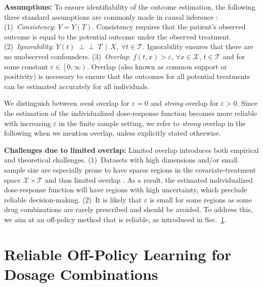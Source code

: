 \documentclass{article}
\theoremstyle{definition}
\theoremstyle{plain}
\newcommand{\indep}{\perp \!\!\! \perp}
\begin{document}
\textbf{Assumptions:} To ensure identifiability of the outcome estimation, the following three standard assumptions are commonly made in causal inference \cite{Rubin.1974}: (1)~\emph{Consistency}: $Y = Y(T)$. Consistency requires that the patient's observed outcome is equal to the potential outcome under the observed treatment. (2)~\emph{Ignorability}: $Y(t) \; \indep \; T\,\mid\,X, \; \forall t \in \mathcal{T}$. Ignorability ensures that there are no unobserved confounders. (3)~\emph{Overlap}: $f(t, x) > \varepsilon$,  $\forall x \in \mathcal{X},\, t \in \mathcal{T}$ and for some constant $\varepsilon \in \left[0, \infty \right)$. Overlap (also known as {common support} or {positivity}) is necessary to ensure that the outcomes for all potential treatments can be estimated accurately for all individuals. 

We distinguish between \emph{weak} overlap for $\varepsilon = 0$ and \emph{strong} overlap for $\varepsilon > 0$. Since the estimation of the individualized dose-response function becomes more reliable with increasing $\varepsilon$ in the finite sample setting, we refer to \emph{strong} overlap in the following when we mention overlap, unless explicitly stated otherwise. 

\textbf{Challenges due to limited overlap:} Limited overlap introduces both empirical and theoretical challenges. (1)~Datasets with high dimensions and/or small sample size are especially prone to have sparse regions in the covariate-treatment space $\mathcal{X} \times \mathcal{T}$ and thus limited overlap \cite{DAmour.2021}. As a result, the estimated individualized dose-response function will have regions with high uncertainty, which preclude reliable decision-making. (2)~It is likely that $\varepsilon$ is small for some regions as some drug combinations are rarely prescribed and should be avoided. To address this, we aim at an off-policy method that is reliable, as introduced in Sec.~\ref{sec:method}. 


\section{Reliable Off-Policy Learning for Dosage Combinations}\label{sec:method}
\end{document}
